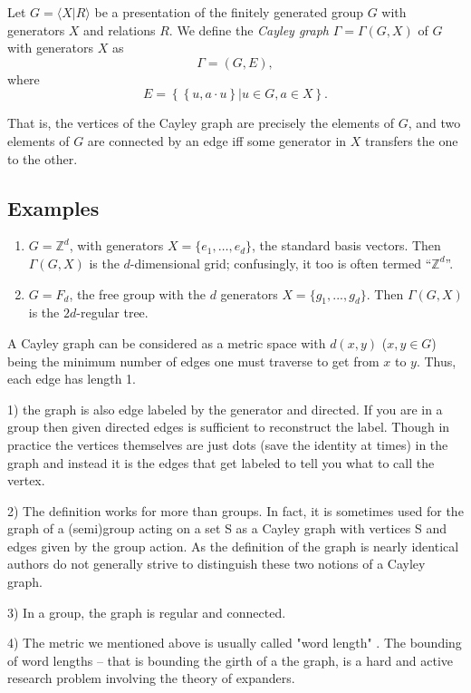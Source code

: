 \documentclass[12pt]{article}
\newcommand{\Ints}{\mathbb{Z}}
\begin{document}
Let $G = \langle X | R \rangle$ be a presentation of the finitely generated group $G$ with generators $X$ and relations $R$.  We define the \emph{Cayley graph} $\Gamma = \Gamma(G,X)$ of $G$ with generators $X$ as
$$
\Gamma =
\left(G,E\right),
$$
where
$$
E =
  \left\{
    \left\{u,a\cdot u \right\} |
    u\in G, a\in X
  \right\}.
$$

That is, the vertices of the Cayley graph are precisely the elements of $G$, and two elements of $G$ are connected by an edge iff some generator in $X$ transfers the one to the other.

\subsection*{Examples}
\begin{enumerate}
\item
$G=\Ints^d$, with generators $X=\{e_1,\ldots,e_d\}$, the standard basis vectors.  Then $\Gamma(G,X)$ is the $d$-dimensional grid; confusingly, it too is often termed ``$\Ints^d$''.
\item
$G=F_d$, the free group with the $d$ generators $X=\{g_1,...,g_d\}$.  Then $\Gamma(G,X)$ is the $2d$-regular tree.
\end{enumerate}


A Cayley graph can be considered as a metric space with $d(x,y)$ ($x,y \in G$) being 
the minimum number of edges one must traverse to get from $x$ to $y$.  Thus, each edge has length 1.


1) the graph is also edge labeled by the generator and directed.  If you are in a group then given directed edges is sufficient to reconstruct the label.
Though in practice the vertices themselves are just dots (save the identity at times) in the graph and instead it is the edges that get labeled to tell you what to call the vertex.

2) The definition works for more than groups.  In fact, it is sometimes  used for the graph of a (semi)group acting on a set S as a Cayley graph with vertices S and edges given by the group action.  As the definition of the graph is nearly identical authors do not generally strive to distinguish these two notions of a Cayley graph.

3)  In a group, the graph is regular and connected.

4)  The metric we mentioned above  is usually called "word length" .  The bounding of word lengths -- that is bounding the girth of a the graph, is a hard and active research problem involving the theory of expanders.
\end{document}
